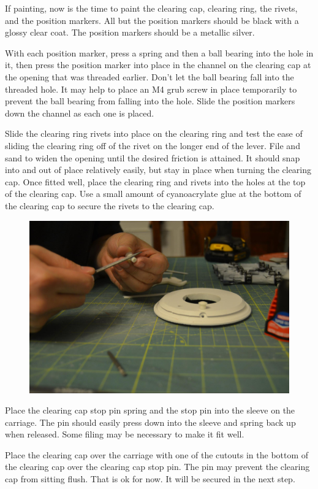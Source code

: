 \documentclass[openany]{book}
\begin{document}
If painting, now is the time to paint the clearing cap, clearing ring, the rivets, and the position markers. All but the position markers should be black with a glossy clear coat. The position markers should be a metallic silver.

With each position marker, press a spring and then a ball bearing into the hole in it, then press the position marker into place in the channel on the clearing cap at the opening that was threaded earlier. Don't let the ball bearing fall into the threaded hole. It may help to place an M4 grub screw in place temporarily to prevent the ball bearing from falling into the hole.
Slide the position markers down the channel as each one is placed.

Slide the clearing ring rivets into place on the clearing ring and test the ease of sliding the clearing ring off of the rivet on the longer end of the lever. File and sand to widen the opening until the desired friction is attained. It should snap into and out of place relatively easily, but stay in place when turning the clearing cap. Once fitted well, place the clearing ring and rivets into the holes at the top of the clearing cap. Use a small amount of cyanoacrylate glue at the bottom of the clearing cap to secure the rivets to the clearing cap.


\begin{figure}[!ht]
	\centering
	\includegraphics[width=.75\textwidth]{images/image5.jpg}
	\caption{}
	\label{fig:image5}	
\end{figure}


Place the clearing cap stop pin spring and the stop pin into the sleeve on the carriage. The pin should easily press down into the sleeve and spring back up when released. Some filing may be necessary to make it fit well.

Place the clearing cap over the carriage with one of the cutouts in the bottom of the clearing cap over the clearing cap stop pin. The pin may prevent the clearing cap from sitting flush. That is ok for now. It will be secured in the next step.
\end{document}
